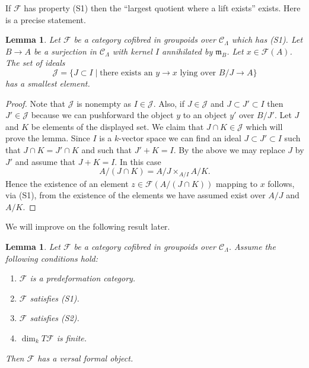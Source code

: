 \documentclass{stacks-project}
\theoremstyle{plain}
\newtheorem{lemma}[subsection]{Lemma}
\theoremstyle{definition}
\theoremstyle{remark}
\numberwithin{equation}{subsection}
\begin{document}
\noindent
If $\mathcal{F}$ has property (S1) then the ``largest quotient where
a lift exists'' exists. Here is a precise statement.

\begin{lemma}
\label{lemma-largest-closed-where-lift}
Let $\mathcal{F}$ be a category cofibred in groupoids over
$\mathcal{C}_\Lambda$ which has (S1). Let $B \to A$ be a surjection
in $\mathcal{C}_\Lambda$ with kernel $I$ annihilated by $\mathfrak m_B$.
Let $x \in \mathcal{F}(A)$. The set of ideals
$$
\mathcal{J} = \{ J \subset I \mid
\text{there exists an }y \to x\text{ lying over }B/J \to A\}
$$
has a smallest element.
\end{lemma}

\begin{proof}
Note that $\mathcal{J}$ is nonempty as $I \in \mathcal{J}$.
Also, if $J \in \mathcal{J}$ and $J \subset J' \subset I$ then
$J' \in \mathcal{J}$ because we can pushforward the object $y$ to an
object $y'$ over $B/J'$. Let $J$ and $K$ be elements of the displayed set.
We claim that $J \cap K \in \mathcal{J}$ which will prove the lemma.
Since $I$ is a $k$-vector space we can find an ideal $J \subset J' \subset I$
such that $J \cap K = J' \cap K$ and such that $J' + K = I$. By the above
we may replace $J$ by $J'$ and assume that $J + K = I$. In this case
$$
A/(J \cap K) = A/J \times_{A/I} A/K.
$$
Hence the existence of an element $z \in \mathcal{F}(A/(J \cap K))$
mapping to $x$ follows, via (S1), from the existence of the elements we have
assumed exist over $A/J$ and $A/K$.
\end{proof}

\noindent
We will improve on the following result later.

\begin{lemma}
\label{lemma-versal-object-existence}
Let $\mathcal{F}$ be a category cofibred in groupoids over
$\mathcal{C}_\Lambda$. Assume the following conditions hold:
\begin{enumerate}
\item $\mathcal{F}$ is a predeformation category.
\item $\mathcal{F}$ satisfies (S1).
\item $\mathcal{F}$ satisfies (S2).
\item $\dim_k T\mathcal{F}$ is finite.
\end{enumerate}
Then $\mathcal{F}$ has a versal formal object.
\end{lemma}
\end{document}
